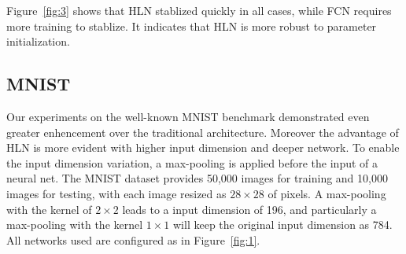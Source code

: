 \documentclass[3p,times,procedia]{elsarticle}
\begin{document}
Figure~\ref{fig:3} shows that HLN
stablized quickly in all cases,
while FCN requires more training
to stablize. It indicates that 
HLN is more robust to parameter
initialization.
\subsection{MNIST}
Our experiments on the well-known MNIST
benchmark demonstrated even
greater enhencement
over the traditional architecture.
Moreover the advantage of HLN is 
more evident
with higher input dimension
and deeper network. 
To enable the input dimension variation,
a max-pooling is applied before the input
of a neural net. The MNIST dataset
provides 50,000 images for training and 
10,000 images for testing, with each image
resized as $28\times 28$ of pixels. 
A max-pooling with the kernel of 
$2\times 2$
leads to a input dimension of 196, and
particularly a max-pooling with the
kernel $1\times 1$ will keep the original
input dimension as 784. All networks used
are configured as in 
Figure~\ref{fig:1}.
\end{document}
